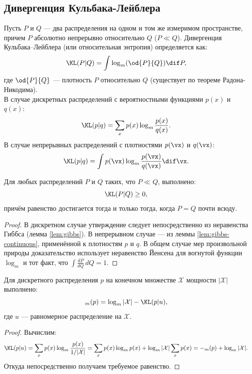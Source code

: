 \subsection{Дивергенция Кульбака-Лейблера}

\begin{definition}
	Пусть $P$ и $Q$ --- два распределения на одном и том же измеримом пространстве, причем $P$ абсолютно непрерывно относительно $Q$ ($P \ll Q$). Дивергенция Кульбака–Лейблера (или относительная энтропия) определяется как:
	\[
		\KL(P | Q) = \int \log_m(\od{P}{Q}) \dif P,
	\]
	где $\od{P}{Q}$ --- плотность $P$ относительно $Q$ (существует по теореме Радона-Никодима). \\
	В случае дискретных распределений с вероятностными функциями $p(x)$ и $q(x)$:
	\[
		\KL(p | q) = \sum_x p(x) \log_m \frac{p(x)}{q(x)}.
	\]
	В случае непрерывных распределений с плотностями $p(\vx)$ и $q(\vx)$:
	\[
		\KL(p | q) = \int p(\vx) \log_m \frac{p(\vx)}{q(\vx)} \dif \vx.
	\]
\end{definition}

\begin{proposition}
	Для любых распределений $P$ и $Q$ таких, что $P \ll Q$, выполнено:
	\[
		\KL(P | Q) \geq 0,
	\]
	причём равенство достигается тогда и только тогда, когда $P = Q$ почти всюду.
\end{proposition}
\begin{proof}
	В дискретном случае утверждение следует непосредственно из неравенства Гиббса (лемма \ref{lem:gibbs}). В непрерывном случае — из леммы \ref{lem:gibbs-continuous}, применённой к плотностям $p$ и $q$. В общем случае мер произвольной природы доказательство использует неравенство Йенсена для вогнутой функции $\log_m$ и тот факт, что $\int \frac{dP}{dQ} \, dQ = 1$.
\end{proof}

\begin{proposition}
	Для дискретного распределения $p$ на конечном множестве $\mathcal{X}$ мощности $|\mathcal{X}|$ выполнено:
	\[
		\H_m(p) = \log_m |\mathcal{X}| - \KL(p | u),
	\]
	где $u$ --- равномерное распределение на $\mathcal{X}$.
\end{proposition}
\begin{proof}
	Вычислим:
	\[
		\KL(p | u) = \sum_x p(x) \log_m \frac{p(x)}{1/|\mathcal{X}|} = \sum_x p(x) \log_m p(x) + \log_m |\mathcal{X}| \sum_x p(x) = -\H_m(p) + \log_m |\mathcal{X}|.
	\]
	Откуда непосредственно получаем требуемое равенство.
\end{proof}

